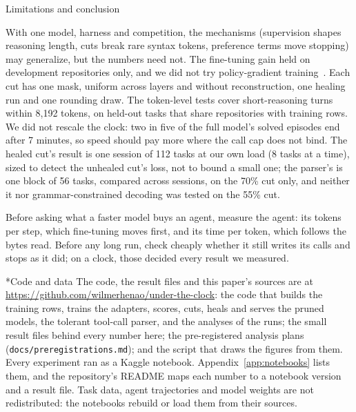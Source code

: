\documentclass[10pt,twocolumn]{article}
\makeatletter
\newcommand{\code}[1]{\texttt{\small #1}}
\renewcommand\section{\@startsection{section}{1}{\z@}{-2.2ex \@plus -.6ex \@minus -.2ex}{1.1ex \@plus .2ex}%
  {\normalfont\large\bfseries}}
\makeatother
\begin{document}
\section{Limitations and conclusion}\label{sec:conclusion}

With one model, harness and competition, the mechanisms (supervision shapes reasoning length, cuts break rare syntax
tokens, preference terms move stopping) may generalize, but the numbers need not. The fine-tuning gain held on
development repositories only, and we did not try policy-gradient training~\citep{wei2025swerl}. Each cut has one
mask, uniform across layers and without reconstruction, one healing run and one rounding draw. The token-level tests
cover short-reasoning turns within 8,192 tokens, on held-out tasks that share repositories with training rows. We did
not rescale the clock: two in five of the full model's solved episodes end after 7 minutes, so speed should pay more
where the call cap does not bind. The healed cut's result is one session of 112 tasks at our own load (8 tasks at a
time), sized to detect the unhealed cut's loss, not to bound a small one; the parser's is one block of 56 tasks,
compared across sessions, on the 70\% cut only, and neither it nor grammar-constrained decoding was tested on the
55\% cut.

Before asking what a faster model buys an agent, measure the agent: its tokens per step, which fine-tuning moves first,
and its time per token, which follows the bytes read. Before any long run, check cheaply whether it still writes its
calls and stops as it did; on a clock, those decided every result we measured.

\section*{Code and data}
The code, the result files and this paper's sources are at \url{https://github.com/wilmerhenao/under-the-clock}: the
code that builds the training rows, trains the adapters, scores, cuts, heals and serves the pruned models, the tolerant
tool-call parser, and the analyses of the runs; the small result files behind every number here; the pre-registered analysis plans
(\code{docs/preregistrations.md}); and the script that draws the figures from them. Every experiment ran as a Kaggle
notebook. Appendix~\ref{app:notebooks} lists them, and the repository's README maps each number to a notebook version
and a result file. Task data, agent trajectories and model weights are not redistributed: the notebooks rebuild or
load them from their sources.
\end{document}
